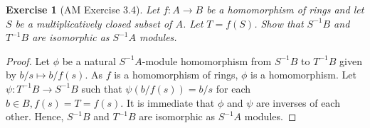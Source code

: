 \documentclass[12pt,letterpaper]{article}
\newtheorem{problem}{Exercise}[section]
\theoremstyle{definition}
\theoremstyle{remark}
\numberwithin{figure}{problem}
\numberwithin{equation}{section}
\begin{document}
\begin{problem}[AM Exercise 3.4] 
Let $f: A \to B$ be a homomorphism of rings and let $S$ be a multiplicatively closed subset of $A$. Let $T= f(S)$. Show that $S^{-1}B$ and $T^{-1}B$ are isomorphic as $S^{-1}A$ modules. 
\end{problem}

\begin{proof}
Let $\phi$ be a natural $S^{-1}A$-module homomorphism from $S^{-1}B$ to $T^{-1}B$ given by $b/s \mapsto b/f(s)$. As $f$ is a homomorphism of rings, $\phi$ is a homomorphism. Let $\psi: T^{-1}B\to S^{-1}B$ such that $\psi(b/f(s)) = b/s$ for each $b \in B, f(s) = T = f(s)$. It is immediate that $\phi$ and $\psi$ are inverses of each other. Hence, $S^{-1}B$ and $T^{-1}B$ are isomorphic as $S^{-1}A$ modules. 
\end{proof}
\end{document}
